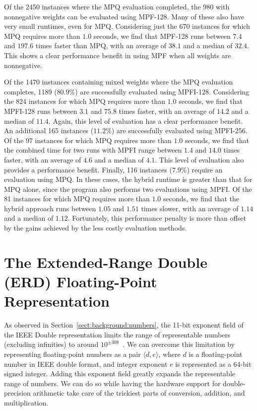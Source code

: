 \documentclass{easychair}
\begin{document}
Of the 2450 instances where the MPQ evaluation completed, the 980 with
nonnegative weights can be evaluated using MPF-128.  Many of these
also have very small runtimes, even for MPQ\@.  Considering just the
670 instances for which MPQ requires more than $1.0$ seconds, we find
that MPF-128 runs between $7.4$ and $197.6$ times faster than MPQ, with an
average of $38.1$ and a median of $32.4$.  This shows a clear
performance benefit in using MPF when all weights are nonnegative.

Of the 1470 instances  containing mixed weights where the MPQ evaluation completes, 1189 ($80.9\%$)
are successfully evaluated using MPFI-128.  Considering the
824 instances for which MPQ requires more than $1.0$ seconds, we find
that MPFI-128 runs between $3.1$ and $75.8$ times faster, with an average of
$14.2$ and a median of $11.4$.  Again, this level of evaluation has a
clear performance benefit.  An additional 165 instances
($11.2\%$) are successfully evaluated using MPFI-256.  Of
the 97 instances for which MPQ requires more than $1.0$ seconds, we
find that the combined time for two runs with MPFI range between $1.4$ and $14.0$ times faster,
with an average of $4.6$ and a median of $4.1$.  This level of evaluation also provides a performance benefit.
Finally, 116 instances ($7.9\%$) require an
evaluation using MPQ\@.  In these cases, the hybrid runtime is
greater than that for MPQ alone, since the program also performs two
evaluations using MPFI\@.  Of the 81 instances for which MPQ requires
more than $1.0$ seconds, we find that the hybrid approach runs between
$1.05$ and $1.51$ times slower, with an average of $1.14$ and a median of $1.12$.
Fortunately, this performance penalty is more than offset by the gains achieved by the less costly evaluation methods.


\section{The Extended-Range Double (ERD) Floating-Point Representation}
\label{sect:erd}

As observed in Section~\ref{sect:background:numbers}, the 11-bit exponent
  field of the IEEE Double representation limits the range of
  representable numbers (excluding infinities) to around
  $10^{\pm308}$~\cite{overton:siam:2001}.  We can overcome this
  limitation by representing floating-point numbers as a pair
  $\langle d, e\rangle$, where $d$ is a floating-point number in IEEE double
  format, and integer exponent $e$ is represented as a 64-bit signed
  integer.
  Adding this exponent field greatly expands the representable range
  of numbers.  We can do so while having the hardware support for
  double-precision arithmetic take care of the trickiest parts of conversion, addition, and multiplication.
\end{document}
